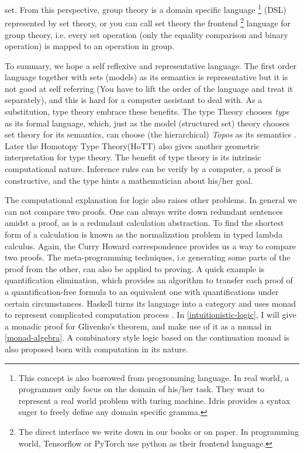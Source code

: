 set. From this perspective, group theory is a domain specific language
\footnote{This concept is also borrowed from progromming language.
In real world, a programmer only focus on the domain of his/her task.
They want to represent a real world problem with turing machine. Idris
provides a syntax suger to freely define any domain specific gramma.} 
(DSL) represented by set theory, or you can call set theory the frontend 
\footnote{The direct interface we write down in our books or on paper. 
In programming world, Tensorflow or PyTorch use python as their frontend 
language.} language for group theory, i.e. every set operation (only the 
equality comparison and binary operation) is mapped to an operation in 
group. 

To summary, we hope a self reflexive and representative language. The
first order language together with sets (models) as its semantics is
representative but it is not good at self referring (You have to lift
the order of the language and treat it separately), and this is hard
for a computer assistant to deal with. As a substitution, type theory
embrace these benefits. The type Theory \cite{intuitionistic-type-theory} 
chooses {\it type} as its formal language, which, just as the model 
(structured set) theory chooses set theory for its semantics, can choose 
(the hierarchical) {\it Topos} as its semantics 
\cite{Introduction-to-higher-order-categorical-logic,
categorical-logic-and-type-theory}. Later the Homotopy Type Theory(HoTT)
\cite{homotopy-type-theory,univalence} also gives another 
geometric interpretation for type theory. The benefit of type
theory is its intrinsic computational nature. Inference rules
can be verify by a computer, a proof is constructive, 
and the type hints a mathematician about his/her goal\cite{coq}.

The computational explanation for logic also raises other problems.
In general we can not compare two proofs. One can always write down
redundant sentences amidst a proof, as is a redundant calculation
abstraction. To find the shortest form of a calculation is known as
the normalization problem in typed lambda calculus\cite{Curry-Howard}.
Again, the Curry Howard correspondence provides us a way to compare two
proofs. The meta-programming techniques, i.e generating some parts of
the proof from the other, can also be applied to proving. A quick example
is quantification elimination, which provides an algorithm to transfer
each proof of a quantification-free formula to an equivalent one with
quantifications under certain circumstances. Haskell
turns its language into a category and uses monad to represent
complicated computation process 
\cite{the-essence-of-functional-programming}. 
In \autoref{intuitionistic-logic},
I will give a monadic proof for Glivenko's theorem, and make use of
it as a monad in \autoref{monad-algebra}. A combinatory style logic 
based on the continuation monad is also proposed born with computation 
in its nature. 

